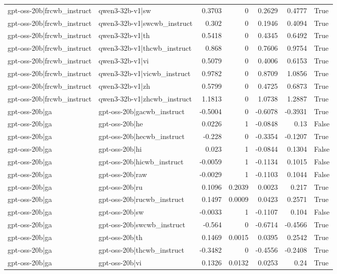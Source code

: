 \begin{table}
\begin{tabular}{l l r r r r l}
gpt-oss-20b|frcwb_instruct & qwen3-32b-v1|sw & 0.3703 & 0 & 0.2629 & 0.4777 & True \\
gpt-oss-20b|frcwb_instruct & qwen3-32b-v1|swcwb_instruct & 0.302 & 0 & 0.1946 & 0.4094 & True \\
gpt-oss-20b|frcwb_instruct & qwen3-32b-v1|th & 0.5418 & 0 & 0.4345 & 0.6492 & True \\
gpt-oss-20b|frcwb_instruct & qwen3-32b-v1|thcwb_instruct & 0.868 & 0 & 0.7606 & 0.9754 & True \\
gpt-oss-20b|frcwb_instruct & qwen3-32b-v1|vi & 0.5079 & 0 & 0.4006 & 0.6153 & True \\
gpt-oss-20b|frcwb_instruct & qwen3-32b-v1|vicwb_instruct & 0.9782 & 0 & 0.8709 & 1.0856 & True \\
gpt-oss-20b|frcwb_instruct & qwen3-32b-v1|zh & 0.5799 & 0 & 0.4725 & 0.6873 & True \\
gpt-oss-20b|frcwb_instruct & qwen3-32b-v1|zhcwb_instruct & 1.1813 & 0 & 1.0738 & 1.2887 & True \\
gpt-oss-20b|ga & gpt-oss-20b|gacwb_instruct & -0.5004 & 0 & -0.6078 & -0.3931 & True \\
gpt-oss-20b|ga & gpt-oss-20b|he & 0.0226 & 1 & -0.0848 & 0.13 & False \\
gpt-oss-20b|ga & gpt-oss-20b|hecwb_instruct & -0.228 & 0 & -0.3354 & -0.1207 & True \\
gpt-oss-20b|ga & gpt-oss-20b|hi & 0.023 & 1 & -0.0844 & 0.1304 & False \\
gpt-oss-20b|ga & gpt-oss-20b|hicwb_instruct & -0.0059 & 1 & -0.1134 & 0.1015 & False \\
gpt-oss-20b|ga & gpt-oss-20b|raw & -0.0029 & 1 & -0.1103 & 0.1044 & False \\
gpt-oss-20b|ga & gpt-oss-20b|ru & 0.1096 & 0.2039 & 0.0023 & 0.217 & True \\
gpt-oss-20b|ga & gpt-oss-20b|rucwb_instruct & 0.1497 & 0.0009 & 0.0423 & 0.2571 & True \\
gpt-oss-20b|ga & gpt-oss-20b|sw & -0.0033 & 1 & -0.1107 & 0.104 & False \\
gpt-oss-20b|ga & gpt-oss-20b|swcwb_instruct & -0.564 & 0 & -0.6714 & -0.4566 & True \\
gpt-oss-20b|ga & gpt-oss-20b|th & 0.1469 & 0.0015 & 0.0395 & 0.2542 & True \\
gpt-oss-20b|ga & gpt-oss-20b|thcwb_instruct & -0.3482 & 0 & -0.4556 & -0.2408 & True \\
gpt-oss-20b|ga & gpt-oss-20b|vi & 0.1326 & 0.0132 & 0.0253 & 0.24 & True \\

\end{tabular}
\end{table}
